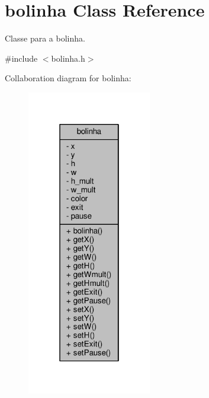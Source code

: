 \hypertarget{classbolinha}{}\section{bolinha Class Reference}
\label{classbolinha}


Classe para a bolinha.  




{\ttfamily \#include $<$bolinha.\+h$>$}



Collaboration diagram for bolinha\+:\nopagebreak
\begin{figure}[H]
\begin{center}
\leavevmode
\includegraphics[width=154pt]{classbolinha__coll__graph}
\end{center}
\end{figure}
